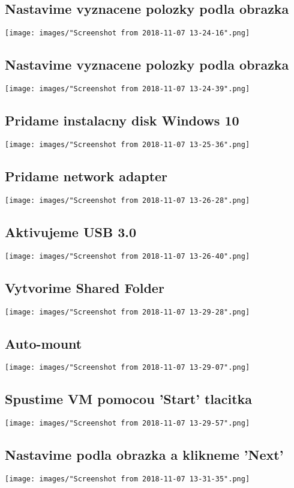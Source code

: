 \documentclass[slovak]{article}
\begin{document}
  \subsection{Nastavime vyznacene polozky podla obrazka}
  \texttt{[image: images/"Screenshot from 2018-11-07 13-24-16".png]}
  \subsection{Nastavime vyznacene polozky podla obrazka}
  \texttt{[image: images/"Screenshot from 2018-11-07 13-24-39".png]}
  \subsection{Pridame instalacny disk Windows 10}
  \texttt{[image: images/"Screenshot from 2018-11-07 13-25-36".png]}
  \subsection{Pridame network adapter}
  \texttt{[image: images/"Screenshot from 2018-11-07 13-26-28".png]}
  \subsection{Aktivujeme USB 3.0}
  \texttt{[image: images/"Screenshot from 2018-11-07 13-26-40".png]}
  \subsection{Vytvorime Shared Folder}
  \texttt{[image: images/"Screenshot from 2018-11-07 13-29-28".png]}
  \subsection{Auto-mount}
  \texttt{[image: images/"Screenshot from 2018-11-07 13-29-07".png]}
  \subsection{Spustime VM pomocou 'Start' tlacitka}
  \texttt{[image: images/"Screenshot from 2018-11-07 13-29-57".png]}
  \subsection{Nastavime podla obrazka a klikneme 'Next'}
  \texttt{[image: images/"Screenshot from 2018-11-07 13-31-35".png]}
\end{document}
